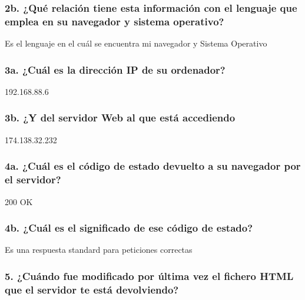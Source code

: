 \documentclass[11pt]{article}
\begin{document}
\hypertarget{b.-quuxe9-relaciuxf3n-tiene-esta-informaciuxf3n-con-el-lenguaje-que-emplea-en-su-navegador-y-sistema-operativo}{%
\subsubsection{2b. ¿Qué relación tiene esta información con el lenguaje
que emplea en su navegador y sistema
operativo?}\label{b.-quuxe9-relaciuxf3n-tiene-esta-informaciuxf3n-con-el-lenguaje-que-emplea-en-su-navegador-y-sistema-operativo}}

Es el lenguaje en el cuál se encuentra mi navegador y Sistema Operativo

\hypertarget{a.-cuuxe1l-es-la-direcciuxf3n-ip-de-su-ordenador}{%
\subsubsection{3a. ¿Cuál es la dirección IP de su
ordenador?}\label{a.-cuuxe1l-es-la-direcciuxf3n-ip-de-su-ordenador}}

192.168.88.6

\hypertarget{b.-y-del-servidor-web-al-que-estuxe1-accediendo}{%
\subsubsection{3b. ¿Y del servidor Web al que está
accediendo}\label{b.-y-del-servidor-web-al-que-estuxe1-accediendo}}

174.138.32.232

\hypertarget{a.-cuuxe1l-es-el-cuxf3digo-de-estado-devuelto-a-su-navegador-por-el-servidor}{%
\subsubsection{4a. ¿Cuál es el código de estado devuelto a su navegador
por el
servidor?}\label{a.-cuuxe1l-es-el-cuxf3digo-de-estado-devuelto-a-su-navegador-por-el-servidor}}

200 OK

\hypertarget{b.-cuuxe1l-es-el-significado-de-ese-cuxf3digo-de-estado}{%
\subsubsection{4b. ¿Cuál es el significado de ese código de
estado?}\label{b.-cuuxe1l-es-el-significado-de-ese-cuxf3digo-de-estado}}

Es una respuesta standard para peticiones correctas

\hypertarget{cuuxe1ndo-fue-modificado-por-uxfaltima-vez-el-fichero-html-que-el-servidor-te-estuxe1-devolviendo}{%
\subsubsection{5. ¿Cuándo fue modificado por última vez el fichero HTML
que el servidor te está
devolviendo?}\label{cuuxe1ndo-fue-modificado-por-uxfaltima-vez-el-fichero-html-que-el-servidor-te-estuxe1-devolviendo}}
\end{document}
